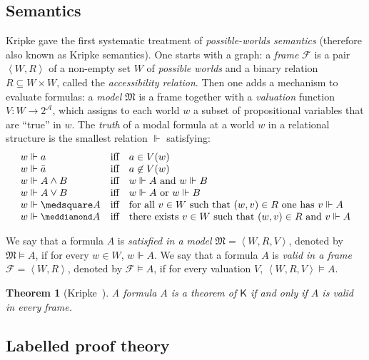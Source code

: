 \documentclass{article}
\newtheorem{theorem}{Theorem}%
\newcommand*\mdelim[3]{%
	\mathopen{}\left#1%
	#3%
	\right#2\mathclose{}%
}
\newcommand*{\tuple}{\mdelim{\langle}{\rangle}}
\newcommand*{\NEG}[1]{\bar{#1}}
\newcommand*{\AND}{\mathbin{\scalebox{.85}{\raise.1ex\hbox{\large$\wedge$}}}}
\newcommand*{\OR}{\mathbin{\scalebox{.85}{\raise.1ex\hbox{\large$\vee$}}}}
\newcommand*{\BOX}{\mathord{\medsquare}}
\newcommand*{\DIA}{\mathord{\scalebox{.9}{\raise.1ex\hbox{$\meddiamond$}}}}
\newcommand*{\A}{\mathcal{A}}
\newcommand*{\F}{\mathcal{F}}
\newcommand*{\M}{\mathfrak{M}}
\newcommand{\force}[2]{#1\Vdash#2}
\newcommand*{\sys}[1]{\ensuremath{\mathsf{#1}}}%
\begin{document}
\subsection{Semantics}

Kripke gave the first systematic treatment of \emph{possible-worlds semantics} (therefore also known as Kripke semantics).
%
One starts with a graph:
%
a \emph{frame} $\F$ is a pair $\tuple{W, R}$ of a non-empty set $W$ of \emph{possible worlds} and a binary relation $R \subseteq W \times W$, called the \emph{accessibility relation}.	
%
Then one adds a mechanism to evaluate formulas:
%
a \emph{model} $\M$ is a frame together with a \emph{valuation} function $V\colon W\to2^\A$, which assigns to each world $w$ a subset of propositional variables that are ``true'' in $w$. 
%
The \emph{truth} of a modal formula at a world $w$ in a relational structure is the smallest relation $\force{}{}$ satisfying:
%
\begin{equation*}
	\begin{array}{l@{\quad\mbox{iff}\quad}l}
		\force{w}{a} & a \in V(w)\\
		\force{w}{\NEG{a}} & a \not\in V(w)\\
		\force{w}{A \AND B} & \force{w}{A} \mbox{ and } \force{w}{B}\\
		\force{w}{A \OR B} & \force{w}{A} \mbox{ or } \force{w}{B}\\
		\force{w}{\BOX A} & \mbox{for all } v \in W \mbox{ such that } (w,v) \in R \mbox{ one has } \force{v}{A}\\
		\force{w}{\DIA A} & \mbox{there exists } v \in W \mbox{ such that } (w,v) \in R \mbox{ and } \force{v}{A}
	\end{array}
\end{equation*}

We say that a formula $A$ is \emph{satisfied in a model} $\M = \tuple{W, R, V}$, denoted by $\M \models A$, if for every $w \in W$, $\force{w}{A}$. 
%
We say that a formula $A$ is \emph{valid in a frame} $\F = \tuple{W,R}$, denoted by $\F \models A$, if for every valuation $V$, $\tuple{W, R, V} \models A$. 

\begin{theorem}[Kripke~\cite{kripke:mlq63}]
	A formula $A$ is a theorem of $\sys{K}$ if and only if $A$ is valid in every frame.
\end{theorem}

\subsection{Labelled proof theory}
\end{document}
